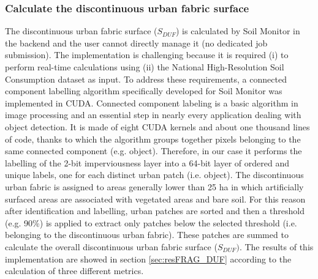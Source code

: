 \documentclass[APA,LATO1COL,doublespace]{WileyNJD-v2}
\begin{document}
\subsubsection{ Calculate the discontinuous urban fabric surface }
\label{sec:mmDUF}
The discontinuous urban fabric surface ($S_{DUF}$) is calculated by Soil Monitor in the backend and the user cannot directly manage it (no dedicated job submission). %
The implementation is challenging because it is required (i) to perform real-time calculations using (ii) the National High-Resolution Soil Consumption dataset as input.
To address these requirements, a connected component labelling algorithm specifically developed for Soil Monitor was implemented in CUDA.
Connected component labeling is a basic algorithm in image processing and an essential step in nearly every application dealing with object detection.
It is made of eight CUDA kernels and about one thousand lines of code, thanks to which the algorithm groups together pixels belonging to the same connected component (e.g. object).
Therefore, in our case it performs the labelling of the 2-bit imperviousness layer into a 64-bit layer of ordered and unique labels, one for each distinct urban patch (i.e. object).
The discontinuous urban fabric is assigned to areas generally lower than 25 ha in which artificially surfaced areas are associated with vegetated areas and bare soil.
For this reason after identification and labelling, urban patches are sorted and then a threshold (e.g. 90\%) is applied to extract only patches below the selected threshold (i.e. belonging to the discontinuous urban fabric).
These patches are summed to calculate the overall discontinuous urban fabric surface ($S_{DUF})$.
The results of this implementation are showed in section \ref{sec:resFRAG_DUF} according to the calculation of three different metrics.
\end{document}

